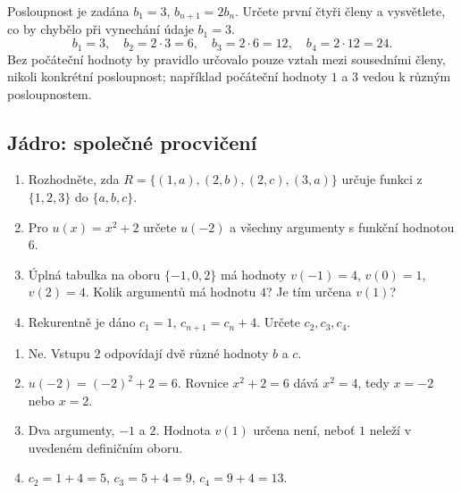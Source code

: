 \documentclass[11pt,a4paper]{article}
\begin{document}
\begin{prikladReseniBox}
Posloupnost je zadána $b_1=3$, $b_{n+1}=2b_n$. Určete první čtyři členy a vysvětlete, co by chybělo při vynechání údaje $b_1=3$.
\tcblower
\[
b_1=3,\quad b_2=2\cdot3=6,\quad b_3=2\cdot6=12,\quad b_4=2\cdot12=24.
\]
Bez počáteční hodnoty by pravidlo určovalo pouze vztah mezi sousedními členy, nikoli konkrétní posloupnost; například počáteční hodnoty $1$ a $3$ vedou k různým posloupnostem.
\end{prikladReseniBox}

\subsection*{Jádro: společné procvičení}
\begin{zadaniReseniBox}
\begin{enumerate}[label=\alph*)]
\item Rozhodněte, zda $R=\{(1,a),(2,b),(2,c),(3,a)\}$ určuje funkci z $\{1,2,3\}$ do $\{a,b,c\}$.
\item Pro $u(x)=x^2+2$ určete $u(-2)$ a všechny argumenty s funkční hodnotou $6$.
\item Úplná tabulka na oboru $\{-1,0,2\}$ má hodnoty $v(-1)=4$, $v(0)=1$, $v(2)=4$. Kolik argumentů má hodnotu $4$? Je tím určena $v(1)$?
\item Rekurentně je dáno $c_1=1$, $c_{n+1}=c_n+4$. Určete $c_2,c_3,c_4$.
\end{enumerate}
\tcblower
\begin{enumerate}[label=\alph*)]
\item Ne. Vstupu $2$ odpovídají dvě různé hodnoty $b$ a $c$.
\item $u(-2)=(-2)^2+2=6$. Rovnice $x^2+2=6$ dává $x^2=4$, tedy $x=-2$ nebo $x=2$.
\item Dva argumenty, $-1$ a $2$. Hodnota $v(1)$ určena není, neboť $1$ neleží v uvedeném definičním oboru.
\item $c_2=1+4=5$, $c_3=5+4=9$, $c_4=9+4=13$.
\end{enumerate}
\end{zadaniReseniBox}
\end{document}
